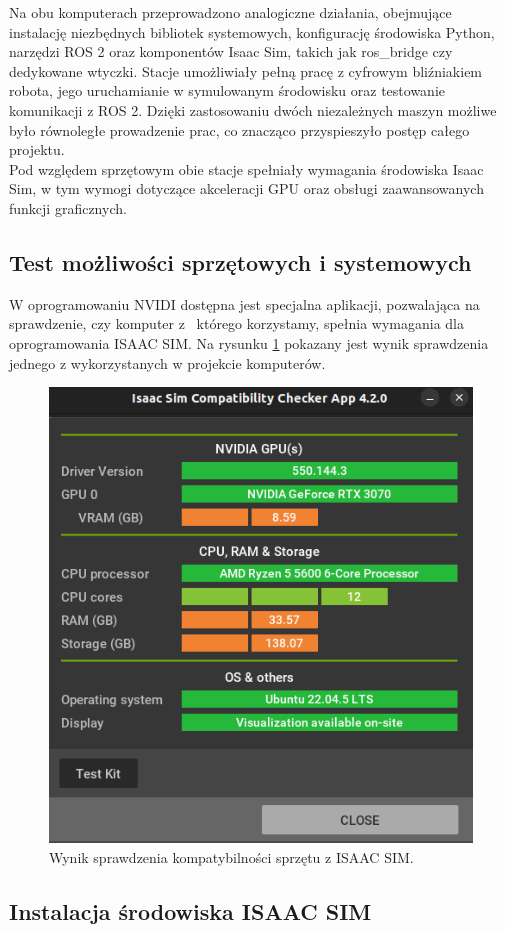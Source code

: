 \documentclass[12pt]{article}
\begin{document}
\noindent Na obu komputerach przeprowadzono analogiczne działania, obejmujące instalację niezbędnych bibliotek systemowych, konfigurację środowiska Python, narzędzi ROS 2 oraz komponentów Isaac Sim, takich jak ros\_bridge czy dedykowane wtyczki. Stacje umożliwiały pełną pracę z cyfrowym bliźniakiem robota, jego uruchamianie w symulowanym środowisku oraz testowanie komunikacji z ROS 2. Dzięki zastosowaniu dwóch niezależnych maszyn możliwe było równoległe prowadzenie prac, co znacząco przyspieszyło postęp całego projektu.\\

\noindent Pod względem sprzętowym obie stacje spełniały wymagania środowiska Isaac Sim, w tym wymogi dotyczące akceleracji GPU oraz obsługi zaawansowanych funkcji graficznych.

\clearpage

\subsection{Test możliwości sprzętowych i systemowych}

W oprogramowaniu NVIDI dostępna jest specjalna aplikacji, pozwalająca na sprawdzenie, czy komputer z~ którego korzystamy, spełnia wymagania dla oprogramowania ISAAC SIM. Na rysunku \ref{sprzetSprawdz} pokazany jest wynik sprawdzenia jednego z wykorzystanych w projekcie komputerów.

\begin{figure}[h]
    \centering
    \includegraphics[width=0.5\linewidth]{Zdjęcia/sprawdzeniSprzetu.png}
    \caption{Wynik sprawdzenia kompatybilności sprzętu z ISAAC SIM.}
    \label{sprzetSprawdz}
\end{figure}

\subsection{Instalacja środowiska ISAAC SIM}
\end{document}
